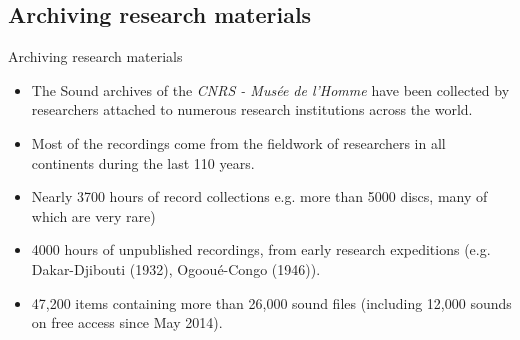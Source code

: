 \documentclass[final, hyperref, table]{beamer}
\begin{document}
\subsection{Archiving research materials}
\begin{frame}{Archiving research materials}
  \begin{block}{}%
    \begin{itemize}
    \item The Sound archives of the \emph{CNRS - Musée de l'Homme}
      have been collected by researchers attached to numerous research
      institutions across the world. %
    \item Most of the recordings come from the fieldwork of
      researchers in \alert{all continents} during the last \alert{110 years}.
    

    \item Nearly \alert{3700 hours of record collections} 
    e.g. more than 5000 discs, many of which are very
      rare)
    \item \alert{4000 hours of unpublished recordings}, from early
      research expeditions (e.g. Dakar-Djibouti (1932), Ogooué-Congo
      (1946)).
    \item \alert{47,200 items} containing more than
      \alert{26,000 sound files} (including 12,000 sounds on free
      access since May 2014).
   
   
   
    \end{itemize}
  \end{block}

\end{frame}
\end{document}
